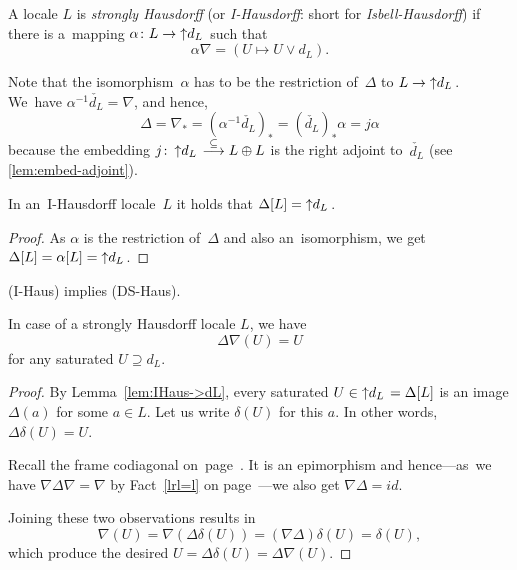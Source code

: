 \begin{framed}
  \begin{df}[I-Haus]
    A locale $L$ is \emph{strongly Hausdorff\/} (or \emph{I-Hausdorff}: short
    for \emph{Isbell-Hausdorff}) if there is a~mapping $\alpha\colon L \to
    \left\uparrow d_L \right.$ such that
    \[
      \alpha \nabla = (U \mapsto U \vee d_L).
    \]
  \end{df}
\end{framed}

Note that the isomorphism~$\alpha$ has to be the restriction of~$\Delta$ to $L
\to \left\uparrow d_L \right.$.
We~have $\alpha^{-1} \check{d_L} = \nabla$, and hence,
\[
\Delta
= \nabla_*
= (\alpha^{-1} \check{d_L})_*
= (\check{d_L})_* \alpha
= j \alpha
\]
because the embedding $j\colon \dL \embed L \oplus L$ is the right adjoint
to~$\check{d_L}$ (see \ref{lem:embed-adjoint}\thinspace).

\begin{lem} \label{lem:IHaus->dL}
  In an~I-Hausdorff locale~$L$ it holds that $\Delta[L] = \left\uparrow d_L \right.$.
\end{lem}
\begin{proof}
  As $\alpha$ is the restriction of~$\Delta$ and also an~isomorphism, we get
  $\Delta[L] = \alpha[L] = \left\uparrow d_L \right.$.
\end{proof}

\begin{thm} \label{IHaus->DSHaus}
  (I-Haus) implies (DS-Haus).
\end{thm}

\begin{lem} \label{lem:delta-nabla=id}
  In case of a strongly Hausdorff locale $L$, we have
  \[
    \Delta\nabla(U) = U
  \]
  for any saturated $U \supseteq d_L$.
\end{lem}
\begin{proof}
  By Lemma~\ref{lem:IHaus->dL}\thinspace, every saturated $U\in \left\uparrow d_L \right. =
  \Delta[L]$ is an image $\Delta(a)$ for some $a\in L$.
  Let us write $\delta(U)$ for this $a$.
  In other words, $\Delta\delta(U) = U$.

  Recall the frame codiagonal on~page~\pageref{codiag-in-Frm}\thinspace.
  It is an epimorphism and hence---as~we have $\nabla \Delta \nabla = \nabla$
  by Fact~\ref{lrl=l} on page~\pageref{lrl=l}\thinspace---we also get $\nabla
  \Delta = id$.

  Joining these two observations results in
  \[
    \nabla (U) = \nabla (\Delta\delta (U)) = (\nabla \Delta)\delta (U) =
    \delta(U),
  \]
  which produce the desired $U = \Delta \delta (U) = \Delta \nabla (U)$.
\end{proof}

